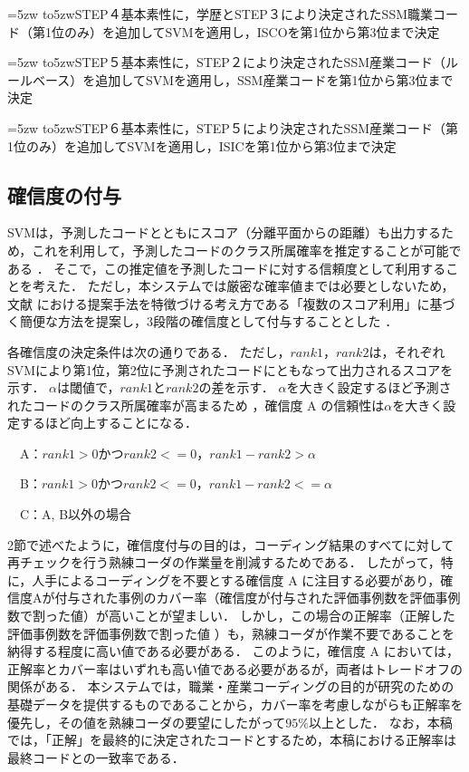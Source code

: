 \documentclass[japanese]{jnlp_1.4}
\begin{document}
\hangindent=5zw
\noindent\hbox to5zw{STEP４\hss}基本素性に，学歴とSTEP３により決定されたSSM職業コード（第1位のみ）を追加してSVMを適用し，ISCOを第1位から第3位まで決定

\hangindent=5zw
\noindent\hbox to5zw{STEP５\hss}基本素性に，STEP２により決定されたSSM産業コード（ルールベース）を追加してSVMを適用し，SSM産業コードを第1位から第3位まで決定

\hangindent=5zw
\noindent\hbox to5zw{STEP６\hss}基本素性に，STEP５により決定されたSSM産業コード（第1位のみ）を追加してSVMを適用し，ISICを第1位から第3位まで決定


\subsection{確信度の付与} 

SVMは，予測したコードとともにスコア（分離平面からの距離）も出力するため，これを利用して，予測したコードのクラス所属確率を推定することが可能である \cite{Takahashi_et_al08}． 
そこで，この推定値を予測したコードに対する信頼度として利用することを考えた．
ただし，本システムでは厳密な確率値までは必要としないため，文献 \cite{Takahashi_et_al08}における提案手法を特徴づける考え方である「複数のスコア利用」に基づく簡便な方法を提案し，3段階の確信度として付与することとした \cite{Takahashi_et_al13a}．

各確信度の決定条件は次の通りである．
ただし，$rank1$，$rank2$は，それぞれSVMにより第1位，第2位に予測されたコードにともなって出力されるスコアを示す．
$\alpha$は閾値で，$rank1$と$rank2$の差を示す．
$\alpha$を大きく設定するほど予測されたコードのクラス所属確率が高まるため \cite{Takahashi_et_al08}，確信度 A の信頼性は$\alpha$を大きく設定するほど向上することになる．

\vspace{1\Cvs}
　A：$rank1>0$かつ$rank2<=0$，$rank1-rank2>\alpha$

　B：$rank1>0$かつ$rank2<=0$，$rank1-rank2<=\alpha$

　C：A, B以外の場合
\vspace{1\Cvs}

2節で述べたように，確信度付与の目的は，コーディング結果のすべてに対して再チェックを行う熟練コーダの作業量を削減するためである．
したがって，特に，人手によるコーディングを不要とする確信度 A に注目する必要があり，確信度Aが付与された事例のカバー率（確信度が付与された評価事例数を評価事例数で割った値）が高いことが望ましい．
しかし，この場合の正解率（正解した評価事例数を評価事例数で割った値 \cite{Takamura10}）も，熟練コーダが作業不要であることを納得する程度に高い値である必要がある．
このように，確信度 A においては，正解率とカバー率はいずれも高い値である必要があるが，両者はトレードオフの関係がある．
本システムでは，職業・産業コーディングの目的が研究のための基礎データを提供するものであることから，カバー率を考慮しながらも正解率を優先し，その値を熟練コーダの要望にしたがって$95\%$以上とした．
なお，本稿では，「正解」を最終的に決定されたコードとするため，本稿における正解率は最終コードとの一致率である．
\end{document}
